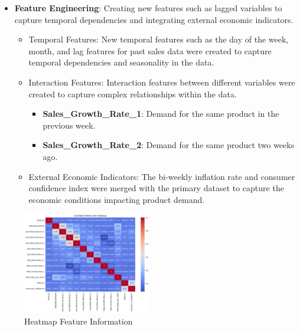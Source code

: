 \documentclass[letterpaper, 10 pt, conference]{ieeeconf}  %
\begin{document}
\begin{itemize}
        \item \textbf{Feature Engineering}: Creating new features such as lagged variables to capture temporal dependencies and integrating external economic indicators.
        \begin{itemize}
                \item Temporal Features: New temporal features such as the day of the week, month, and lag features for past sales data were created to capture temporal dependencies and seasonality in the data.
                \item Interaction Features: Interaction features between different variables were created to capture complex relationships within the data.
                \begin{itemize}
                        \item \textbf{Sales\_Growth\_Rate\_1}: Demand for the same product in the previous week.
                        \item \textbf{Sales\_Growth\_Rate\_2}: Demand for the same product two weeks ago.   
                \end{itemize}
                \item External Economic Indicators: The bi-weekly inflation rate and consumer confidence index were merged with the primary dataset to capture the economic conditions impacting product demand.
        \end{itemize}
\end{itemize}

\begin{figure}[H] 
        \begin{center}
        \centering
        \includegraphics[width=0.5\textwidth]{images/output.png}
        \caption{Heatmap Feature Information}
        \end{center}
\end{figure} 
\end{document}
